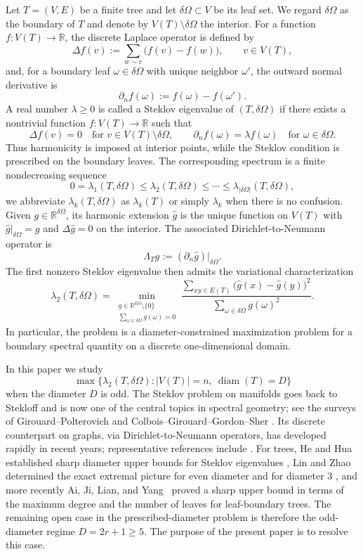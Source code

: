 \documentclass[11pt]{article}
\theoremstyle{remark}
\newcommand{\diam}{\operatorname{diam}}
\begin{document}
Let $T=(V,E)$ be a finite tree and let $\delta\Omega\subset V$ be its leaf set. We regard
$\delta\Omega$ as the boundary of $T$ and denote by $V(T)\setminus\delta\Omega$ the interior.
For a function $f\colon V(T)\to\mathbb R$, the discrete Laplace operator is defined by
$$
\Delta f(v):=\sum_{w\sim v}\bigl(f(v)-f(w)\bigr),\qquad v\in V(T),
$$
and, for a boundary leaf $\omega\in\delta\Omega$ with unique neighbor $\omega'$, the outward
normal derivative is
$$
\partial_n f(\omega):=f(\omega)-f(\omega').
$$
A real number $\lambda\ge0$ is called a Steklov eigenvalue of $(T,\delta\Omega)$ if there exists a
nontrivial function $f\colon V(T)\to\mathbb R$ such that
$$
\Delta f(v)=0 \quad \text{for } v\in V(T)\setminus\delta\Omega,
\qquad
\partial_n f(\omega)=\lambda f(\omega) \quad \text{for } \omega\in\delta\Omega.
$$
Thus harmonicity is imposed at interior points, while the Steklov condition is prescribed on the
boundary leaves. The corresponding spectrum is a finite nondecreasing sequence
$$
0=\lambda_1(T,\delta\Omega)\le \lambda_2(T,\delta\Omega)\le \cdots \le
\lambda_{|\delta\Omega|}(T,\delta\Omega),
$$
 we abbreviate $\lambda_k(T,\delta\Omega)$ as $\lambda_k(T)$ or simply $\lambda_k$ when there is no
confusion. Given $g\in\mathbb R^{\delta\Omega}$, its harmonic extension $\widehat g$ is the
unique function on $V(T)$ with $\widehat g|_{\delta\Omega}=g$ and $\Delta\widehat g=0$ on the
interior. The associated Dirichlet-to-Neumann operator is
$$
\Lambda_T g := (\partial_n \widehat g)|_{\delta\Omega}.
$$
The first nonzero Steklov eigenvalue then admits the variational characterization
$$
\lambda_2(T,\delta\Omega)
=
\min_{\substack{g\in\mathbb R^{\delta\Omega}\setminus\{0\}\\
\sum_{\omega\in\delta\Omega} g(\omega)=0}}
\frac{\sum_{xy\in E(T)}\bigl(\widehat g(x)-\widehat g(y)\bigr)^2}{\sum_{\omega\in\delta\Omega} g(\omega)^2}.
$$
In particular, the problem is a diameter-constrained maximization problem for a boundary spectral
quantity on a discrete one-dimensional domain.

In this paper we study
$$
\max\{\lambda_2(T,\delta\Omega): |V(T)|=n,\ \diam(T)=D\}
$$
when the diameter $D$ is odd. The Steklov problem on manifolds goes back to Stekloff and is now one of
the central topics in spectral geometry; see the surveys of Girouard--Polterovich and
Colbois--Girouard--Gordon--Sher
\cite{Stekloff1902,GirouardPolterovich2017,ColboisGirouardGordonSher2024}.
Its discrete counterpart on graphs, via Dirichlet-to-Neumann operators, has developed rapidly in
recent years; representative references include
\cite{HuaHuangWang2017,HassannezhadMiclo2020,Perrin2019,Perrin2021,Tschanz2022,HanHua2023,ShiYuComp2022,ShiYuLich2022,YuYu2024,LinZhaoPlanar2025,LLYZ-2026}.
For trees, He and Hua established sharp diameter upper bounds for Steklov eigenvalues
\cite{HeHua2022}, Lin and Zhao determined the exact extremal picture for even diameter and for
diameter $3$ \cite{LinZhaoTrees2025}, and more recently Ai, Ji, Lian, and Yang~\cite{AiJiLianYang2026} proved a sharp
upper bound in terms of the maximum degree and the number of leaves for leaf-boundary trees. 
The remaining open case in the prescribed-diameter problem is therefore the odd-diameter regime $D=2r+1\ge5$. The purpose of the present paper is to resolve this case.
\end{document}
